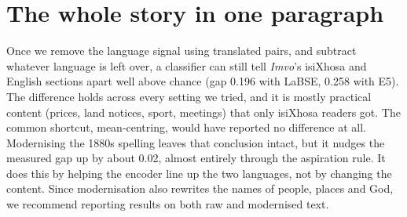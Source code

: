 \documentclass[11pt,a4paper]{article}
\begin{document}
\section{The whole story in one paragraph}
Once we remove the language signal using translated pairs, and subtract whatever language is left
over, a classifier can still tell \emph{Imvo}'s isiXhosa and English sections apart well above chance
(gap 0.196 with LaBSE, 0.258 with E5). The difference holds across every setting we tried, and it is
mostly practical content (prices, land notices, sport, meetings) that only isiXhosa readers got. The
common shortcut, mean-centring, would have reported no difference at all. Modernising the 1880s
spelling leaves that conclusion intact, but it nudges the measured gap up by about 0.02, almost
entirely through the aspiration rule. It does this by helping the encoder line up the two languages,
not by changing the content. Since modernisation also rewrites the names of people, places and God,
we recommend reporting results on both raw and modernised text.
\end{document}

